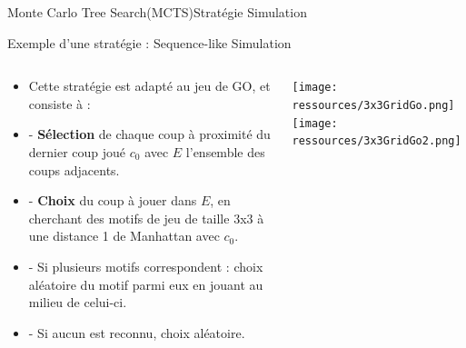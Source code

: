 \begin{frame}{Monte Carlo Tree Search(MCTS)}{Stratégie Simulation}
	\begin{block}{Exemple d'une stratégie : Sequence-like Simulation}
		\begin{columns}
			\begin{column}{8cm}
				\begin{itemize}
					\item Cette stratégie est adapté au jeu de GO, et consiste à :
					\item - \textbf{Sélection} de chaque coup à proximité du dernier coup joué $c_{0}$ avec $E$ l'ensemble des coups adjacents. 
					\item - \textbf{Choix} du coup à jouer dans $E$, en cherchant des motifs de jeu de taille 3x3 à une distance 1 de Manhattan avec $c_{0}$. 
					\item - Si plusieurs motifs correspondent : choix aléatoire du motif parmi eux en jouant au milieu de celui-ci.
					\item - Si aucun est reconnu, choix aléatoire.
				\end{itemize}
			\end{column}
			\begin{column}{3cm}
				\texttt{[image: ressources/3x3GridGo.png]}
				\texttt{[image: ressources/3x3GridGo2.png]}
			\end{column}
		\end{columns}
	\end{block}\end{frame}

